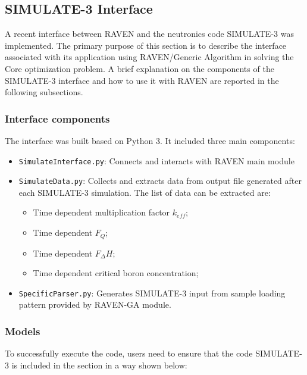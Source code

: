 \subsection{SIMULATE-3 Interface}
A recent interface between RAVEN and the neutronics code SIMULATE-3 was implemented.
The primary purpose of this section is to describe the interface associated 
with its application using RAVEN/Generic Algorithm in solving the Core optimization problem.
A brief explanation on the components of the SIMULATE-3 interface and how to use it with RAVEN 
are reported in the following subsections.

\subsubsection{Interface components}
The interface was built based on Python 3. It included three main components: 
\begin{itemize}

    \item \texttt{SimulateInterface.py}: Connects and interacts with RAVEN main module
    \item \texttt{SimulateData.py}: Collects and extracts data from output file generated after each SIMULATE-3 simulation. The list of data can be extracted are:
    \begin{itemize}
  \item Time dependent multiplication factor $k_{eff}$;
    \item Time dependent $F_Q$;
    \item Time dependent $F_\Delta H$;
    \item Time dependent critical boron concentration;
  \end{itemize}
  \item \texttt{SpecificParser.py}: Generates SIMULATE-3 input from sample loading pattern provided by RAVEN-GA module. 
\end{itemize}

\subsubsection{Models}
To successfully execute the code, users need to ensure that the code SIMULATE-3 is included in the 
 section in a way shown below:

